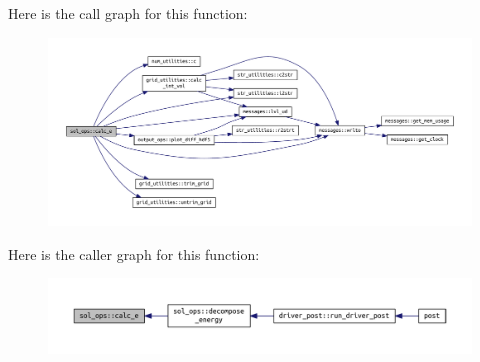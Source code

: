 Here is the call graph for this function\+:
\nopagebreak
\begin{figure}[H]
\begin{center}
\leavevmode
\includegraphics[width=350pt]{namespacesol__ops_aaeb4b122754fc6a4f538b22d72b6cba0_cgraph}
\end{center}
\end{figure}
Here is the caller graph for this function\+:
\nopagebreak
\begin{figure}[H]
\begin{center}
\leavevmode
\includegraphics[width=350pt]{namespacesol__ops_aaeb4b122754fc6a4f538b22d72b6cba0_icgraph}
\end{center}
\end{figure}
\mbox{\label{namespacesol__ops_a5e15aa2fa915e7de74ce74f02cd35fac}} 
